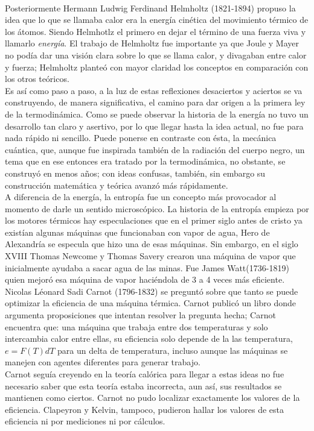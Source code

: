 \\
Posteriormente Hermann Ludwig Ferdinand Helmholtz (1821-1894) propuso la idea que lo que se llamaba calor era la energía cinética del movimiento térmico de los átomos. Siendo Helmhotlz el primero en dejar el término de una fuerza viva y llamarlo \textit{energía}. El trabajo de Helmholtz fue importante ya que Joule y Mayer no podía dar una visión clara sobre lo que se llama calor, y divagaban entre calor y fuerza; Helmholtz planteó con mayor claridad los conceptos en comparación con los otros teóricos.
\\
Es así como paso a paso, a la luz de estas reflexiones desaciertos y aciertos se va construyendo, de manera significativa, el camino para dar origen a la primera ley de la termodinámica. Como se puede observar la historia de la energía no tuvo un desarrollo tan claro y asertivo, por lo que llegar hasta la idea actual, no fue para nada rápido ni sencillo. Puede ponerse en contraste con ésta, la mecánica cuántica, que, aunque fue inspirada también de la radiación del cuerpo negro, un tema que en ese entonces era tratado por la termodinámica, no obstante, se construyó en menos años; con ideas confusas, también, sin embargo su construcción matemática y teórica avanzó más rápidamente. 
\\
A diferencia de la energía, la entropía fue un concepto más provocador al momento de darle un sentido microscópico. La historia de la entropía empieza por los motores térmicos hay especulaciones que en el primer siglo antes de cristo ya existían algunas máquinas que funcionaban con vapor de agua, Hero de Alexandría se especula que hizo una de esas máquinas. Sin embargo, en el siglo XVIII Thomas Newcome y Thomas Savery crearon una máquina de vapor que inicialmente ayudaba a sacar agua de las minas. Fue James Watt(1736-1819) quien mejoró esa máquina de vapor haciéndola de 3 a 4 veces más eficiente.
\\
Nicolas Léonard Sadi Carnot (1796-1832) se preguntó sobre que tanto se puede optimizar la eficiencia de una máquina térmica. Carnot publicó un libro donde argumenta proposiciones que intentan resolver la pregunta hecha; Carnot encuentra que: una máquina que trabaja entre dos temperaturas y solo intercambia calor entre ellas, su eficiencia solo depende de la  las temperatura, $e=F(T)dT$ para un delta de temperatura, incluso aunque las máquinas se manejen con agentes diferentes para generar trabajo.
\\
Carnot seguía creyendo en la teoría calórica para llegar a estas ideas no fue necesario saber que esta teoría estaba incorrecta, aun así, sus resultados se mantienen como ciertos. Carnot no pudo localizar exactamente los valores de la eficiencia. Clapeyron y Kelvin, tampoco, pudieron hallar los valores de esta eficiencia ni por mediciones ni por cálculos.
